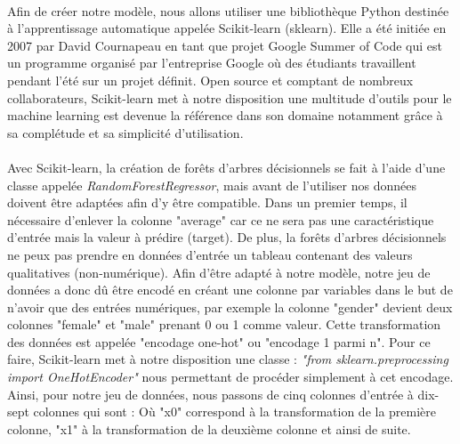 \paragraph{}Afin de créer notre modèle, nous allons utiliser une bibliothèque Python destinée à l'apprentissage automatique appelée Scikit-learn (sklearn)\cite{sklearnDepot}. Elle a été initiée en 2007 par David Cournapeau en tant que projet Google Summer of Code qui est un programme organisé par l'entreprise Google où des étudiants travaillent pendant l'été sur un projet définit. Open source et comptant de nombreux collaborateurs, Scikit-learn met à notre disposition une multitude d'outils pour le machine learning est devenue la référence dans son domaine notamment grâce à sa complétude et sa simplicité d'utilisation.

\paragraph{}Avec Scikit-learn, la création de forêts d'arbres décisionnels se fait à l'aide d'une classe appelée \textit{RandomForestRegressor}, mais avant de l'utiliser nos données doivent être adaptées afin d'y être compatible. Dans un premier temps, il nécessaire d'enlever la colonne "average" car ce ne sera pas une caractéristique d'entrée mais la valeur à prédire (target). De plus, la forêts d'arbres décisionnels ne peux pas prendre en données d'entrée un tableau contenant des valeurs qualitatives (non-numérique). Afin d'être adapté à notre modèle, notre jeu de données a donc dû être encodé en créant une colonne par variables dans le but de n'avoir que des entrées numériques, par exemple la colonne "gender" devient deux colonnes "female" et "male" prenant 0 ou 1 comme valeur. Cette transformation des données est appelée "encodage one-hot" ou "encodage 1 parmi n". Pour ce faire, Scikit-learn met à notre disposition une classe : \textit{"from sklearn.preprocessing import OneHotEncoder"} nous permettant de procéder simplement à cet encodage. Ainsi, pour notre jeu de données, nous passons de cinq colonnes d'entrée à dix-sept colonnes qui sont : \medbreak
Où "x0" correspond à la transformation de la première colonne, "x1" à la transformation de la deuxième colonne et ainsi de suite.

